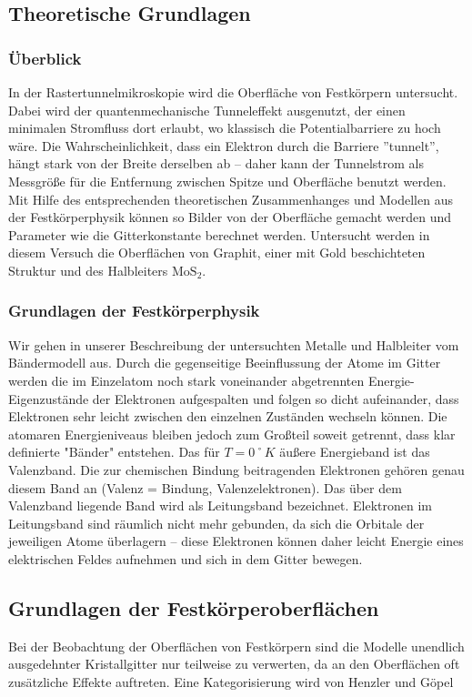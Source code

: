 \subsection{Theoretische Grundlagen}

\subsubsection{Überblick}
In der Rastertunnelmikroskopie wird die Oberfläche von Festkörpern untersucht. 
Dabei wird der quantenmechanische Tunneleffekt ausgenutzt, der einen minimalen 
Stromfluss dort erlaubt, wo klassisch die Potentialbarriere zu hoch wäre. 
Die Wahrscheinlichkeit, dass ein Elektron durch die Barriere ”tunnelt”, 
hängt stark von der Breite derselben ab – daher kann der Tunnelstrom als 
Messgröße für die Entfernung zwischen Spitze und Oberfläche benutzt werden. 
Mit Hilfe des entsprechenden theoretischen Zusammenhanges und Modellen aus 
der Festkörperphysik können so Bilder von der Oberfläche gemacht werden und 
Parameter wie die Gitterkonstante berechnet werden. Untersucht werden in 
diesem Versuch die Oberflächen von Graphit, einer mit Gold beschichteten 
Struktur und des Halbleiters $\mathrm{MoS_2}$. 

\subsubsection{Grundlagen der Festkörperphysik}
Wir gehen in unserer Beschreibung der untersuchten Metalle und Halbleiter 
vom Bändermodell aus. Durch die gegenseitige Beeinflussung der Atome im Gitter
werden die im Einzelatom noch stark voneinander abgetrennten Energie-Eigenzustände
der Elektronen aufgespalten und folgen so dicht aufeinander, dass Elektronen 
sehr leicht zwischen den einzelnen Zuständen wechseln können. Die atomaren
Energieniveaus bleiben jedoch zum Großteil soweit getrennt, dass klar definierte
"Bänder" entstehen. Das für $T = 0˚ K$ äußere Energieband ist das Valenzband.
Die zur chemischen Bindung beitragenden Elektronen gehören genau diesem Band an 
(Valenz = Bindung, Valenzelektronen). Das über dem Valenzband liegende Band wird 
als Leitungsband bezeichnet. Elektronen im Leitungsband sind räumlich nicht mehr 
gebunden, da sich die Orbitale der jeweiligen Atome überlagern – diese Elektronen 
können daher leicht Energie eines elektrischen Feldes aufnehmen und sich in dem 
Gitter bewegen. \\

\subsection{Grundlagen der Festkörperoberflächen}
Bei der Beobachtung der Oberflächen von Festkörpern sind die Modelle unendlich 
ausgedehnter Kristallgitter nur teilweise zu verwerten, da an den Oberflächen 
oft zusätzliche Effekte auftreten. Eine Kategorisierung wird von Henzler und 
Göpel 
